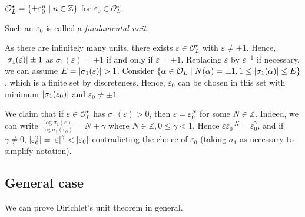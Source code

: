 \begin{corollary}
    \( \mathcal O_L^\star = \qty{\pm \varepsilon_0^n \mid n \in \mathbb Z} \) for \( \varepsilon_0 \in \mathcal O_L^\star \).
\end{corollary}
Such an \( \varepsilon_0 \) is called a \emph{fundamental unit}.
\begin{remark}
    As there are infinitely many units, there exists \( \varepsilon \in \mathcal O_L^\star \) with \( \varepsilon \neq \pm 1 \).
    Hence, \( \abs{\sigma_1(\varepsilon)} \pm 1 \) as \( \sigma_1(\varepsilon) = \pm 1 \) if and only if \( \varepsilon = \pm 1 \).
    Replacing \( \varepsilon \) by \( \varepsilon^{-1} \) if necessary, we can assume \( E = \abs{\sigma_1(\varepsilon)} > 1 \).
    Consider \( \qty{\alpha \in \mathcal O_L \mid N(\alpha) = \pm 1, 1 \leq \abs{\sigma_1(\alpha)} \leq E} \), which is a finite set by discreteness.
    Hence, \( \varepsilon_0 \) can be chosen in this set with minimum \( \abs{\sigma_1(\varepsilon_0)} \) and \( \varepsilon_0 \neq \pm 1 \).

    We claim that if \( \varepsilon \in \mathcal O_L^\star \) has \( \sigma_1(\varepsilon) > 0 \), then \( \varepsilon = \varepsilon_0^N \) for some \( N \in \mathbb Z \).
    Indeed, we can write \( \frac{\log \sigma_1(\varepsilon)}{\log \sigma_1(\varepsilon_0)} = N + \gamma \) where \( N \in \mathbb Z, 0 \leq \gamma < 1 \).
    Hence \( \varepsilon \varepsilon_0^{-N} = \varepsilon_0^\gamma \), and if \( \gamma \neq 0 \), \( \abs{\varepsilon_0^\gamma} = \abs{\varepsilon}^\gamma < \abs{\varepsilon_0} \) contradicting the choice of \( \varepsilon_0 \) (taking \( \sigma_1 \) as necessary to simplify notation).
\end{remark}

\subsection{General case}
We can prove Dirichlet's unit theorem in general.

